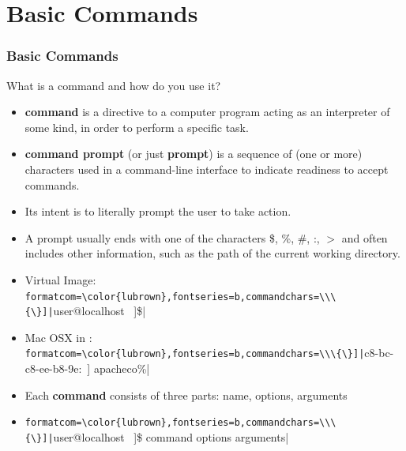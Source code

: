 \documentclass[10pt,t]{beamer}
\begin{document}
\section{Basic Commands}
\begin{frame}[fragile]
  \frametitle{Basic Commands}
  \begin{exampleblock}{What is a command and how do you use it?}
    \begin{itemize}
      \item \textbf{command} is a directive to a computer program acting as an interpreter of some kind, in order to perform a specific task.
      \item \textbf{command prompt} (or just \textbf{prompt}) is a sequence of (one or more) characters used in a command-line interface to indicate readiness to accept commands.
      \item Its intent is to literally prompt the user to take action. 
      \item A prompt usually ends with one of the characters \$, \%, \#, :, $>$ and often includes other information, such as the path of the current working directory.
      \item[$\mybigstar$] Virtual Image: \Verb[formatcom=\color{lubrown},fontseries=b,commandchars=\\\{\}]|[user@localhost ~]\$|
      \item[$\mybigstar$] Mac OSX in : \Verb[formatcom=\color{lubrown},fontseries=b,commandchars=\\\{\}]|[c8-bc-c8-ee-b8-9e:~] apacheco\%|
      \item Each \textbf{command} consists of three parts: name, options, arguments
      \item[] \Verb[formatcom=\color{lubrown},fontseries=b,commandchars=\\\{\}]|[user@localhost ~]\$ command options arguments|
    \end{itemize}
  \end{exampleblock}
\end{frame}
\end{document}
